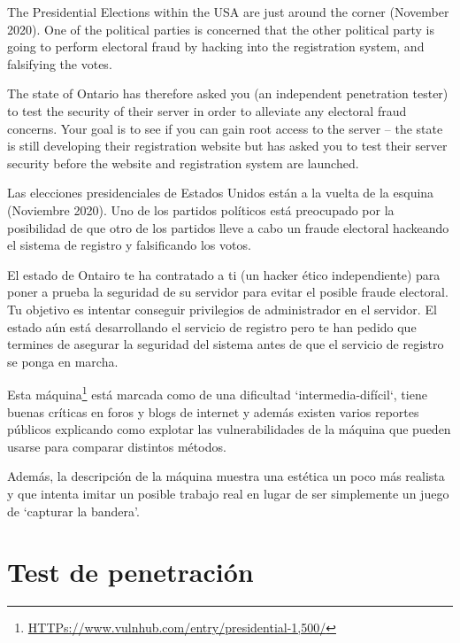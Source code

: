 \begin{tcolorbox}[coltitle=blue!50!black,colframe=blue!25,title=Descripción de la máquina Presidential 1]
The Presidential Elections within the USA are just around the corner (November 2020). One of the political parties is concerned that the other political party is going to perform electoral fraud by hacking into the registration system, and falsifying the votes.

The state of Ontario has therefore asked you (an independent penetration tester) to test the security of their server in order to alleviate any electoral fraud concerns. Your goal is to see if you can gain root access to the server – the state is still developing their registration website but has asked you to test their server security before the website and registration system are launched.

\tcblower

Las elecciones presidenciales de Estados Unidos están a la vuelta de la esquina (Noviembre 2020). Uno de los partidos políticos está preocupado por la posibilidad de que otro de los partidos lleve a cabo un fraude electoral hackeando el sistema de registro y falsificando los votos.

El estado de Ontairo te ha contratado a ti (un hacker ético independiente) para poner a prueba la seguridad de su servidor para evitar el posible fraude electoral. Tu objetivo es intentar conseguir privilegios de administrador en el servidor. El estado aún está desarrollando el servicio de registro pero te han pedido que termines de asegurar la seguridad del sistema antes de que el servicio de registro se ponga en marcha.

\end{tcolorbox}

Esta máquina\footnote{\url{HTTPs://www.vulnhub.com/entry/presidential-1,500/}} está marcada como de una dificultad `intermedia-difícil`, tiene buenas críticas en foros y blogs de internet y además existen varios reportes públicos explicando como explotar las vulnerabilidades de la máquina que pueden usarse para comparar distintos métodos.

Además, la descripción de la máquina muestra una estética un poco más realista y que intenta imitar un posible trabajo real en lugar de ser simplemente un juego de `capturar la bandera'.


\section{Test de penetración}

